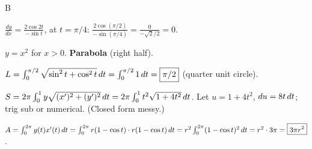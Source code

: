 \documentclass[11pt]{article}
\begin{document}
\begin{answers}{B}
\item $\tfrac{dy}{dx} = \tfrac{2\cos 2t}{-\sin t}$, at $t=\pi/4$: $\tfrac{2\cos(\pi/2)}{-\sin(\pi/4)} = \tfrac{0}{-\sqrt 2 /2} = \boxed{0}$.
\item $y = x^2$ for $x > 0$. \textbf{Parabola} (right half).
\item $L = \int_0^{\pi/2} \sqrt{\sin^2 t + \cos^2 t} \,dt = \int_0^{\pi/2} 1 \,dt = \boxed{\pi/2}$ (quarter unit circle).
\item $S = 2\pi \int_0^1 y \sqrt{(x')^2 + (y')^2} \,dt = 2\pi \int_0^1 t^2 \sqrt{1 + 4t^2} \,dt$. Let $u = 1 + 4t^2$, $du = 8t \,dt$; trig sub or numerical. (Closed form messy.)
\item $A = \int_0^{2\pi} y(t) x'(t) \,dt = \int_0^{2\pi} r(1 - \cos t) \cdot r(1 - \cos t) \,dt = r^2 \int_0^{2\pi} (1 - \cos t)^2 \,dt = r^2 \cdot 3\pi = \boxed{3\pi r^2}$.
\end{answers}
\end{document}
